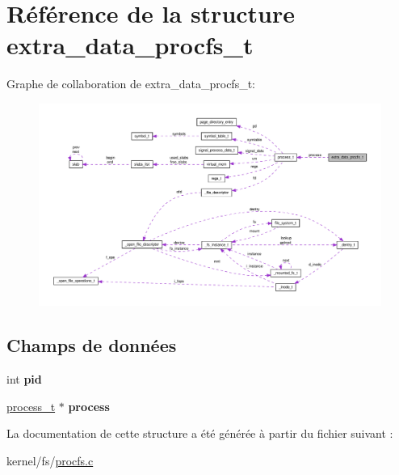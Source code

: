 \hypertarget{structextra__data__procfs__t}{\section{Référence de la structure extra\-\_\-data\-\_\-procfs\-\_\-t}
\label{structextra__data__procfs__t}
}


Graphe de collaboration de extra\-\_\-data\-\_\-procfs\-\_\-t\-:
\nopagebreak
\begin{figure}[H]
\begin{center}
\leavevmode
\includegraphics[width=350pt]{structextra__data__procfs__t__coll__graph}
\end{center}
\end{figure}
\subsection*{Champs de données}
\begin{DoxyCompactItemize}
\item 
\hypertarget{structextra__data__procfs__t_ad501deb466cabf589b4617eac9bcce30}{int {\bfseries pid}}\label{structextra__data__procfs__t_ad501deb466cabf589b4617eac9bcce30}

\item 
\hypertarget{structextra__data__procfs__t_a43e451440ca4470e67c59f6ca0da1e03}{\hyperlink{structprocess__t}{process\-\_\-t} $\ast$ {\bfseries process}}\label{structextra__data__procfs__t_a43e451440ca4470e67c59f6ca0da1e03}

\end{DoxyCompactItemize}


La documentation de cette structure a été générée à partir du fichier suivant \-:\begin{DoxyCompactItemize}
\item 
kernel/fs/\hyperlink{procfs_8c}{procfs.\-c}\end{DoxyCompactItemize}
